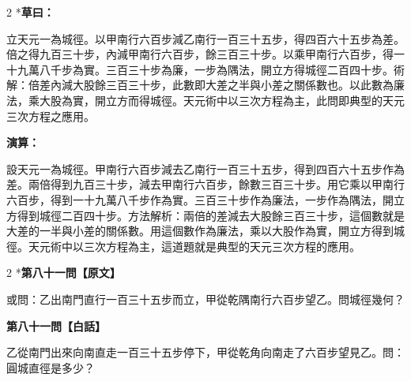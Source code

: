 \documentclass[11pt,a4paper]{article}
\begin{document}
\begin{paracol}{2}
\switchcolumn[0]*\textbf{草曰：}

\small 立天元一為城徑。以甲南行六百步減乙南行一百三十五步，得四百六十五步為差。倍之得九百三十步，內減甲南行六百步，餘三百三十步。以乘甲南行六百步，得一十九萬八千步為實。三百三十步為廉，一步為隅法，開立方得城徑二百四十步。術解：倍差內減大股餘三百三十步，此數即大差之半與小差之關係數也。以此數為廉法，乘大股為實，開立方而得城徑。天元術中以三次方程為主，此問即典型的天元三次方程之應用。

\switchcolumn\textbf{演算：}

\small 設天元一為城徑。甲南行六百步減去乙南行一百三十五步，得到四百六十五步作為差。兩倍得到九百三十步，減去甲南行六百步，餘數三百三十步。用它乘以甲南行六百步，得到一十九萬八千步作為實。三百三十步作為廉法，一步作為隅法，開立方得到城徑二百四十步。方法解析：兩倍的差減去大股餘三百三十步，這個數就是大差的一半與小差的關係數。用這個數作為廉法，乘以大股作為實，開立方得到城徑。天元術中以三次方程為主，這道題就是典型的天元三次方程的應用。
\end{paracol}

\vspace{0.1cm}
\noindent{}
\par\vspace{0.3cm}

\begin{paracol}{2}
\switchcolumn[0]*\noindent\textbf{第八十一問【原文】}

\small 或問：乙出南門直行一百三十五步而立，甲從乾隅南行六百步望乙。問城徑幾何？

\switchcolumn\noindent\textbf{第八十一問【白話】}

\small 乙從南門出來向南直走一百三十五步停下，甲從乾角向南走了六百步望見乙。問：圓城直徑是多少？
\end{paracol}

\vspace{0.1cm}
\noindent{}
\par\vspace{0.15cm}
\end{document}
